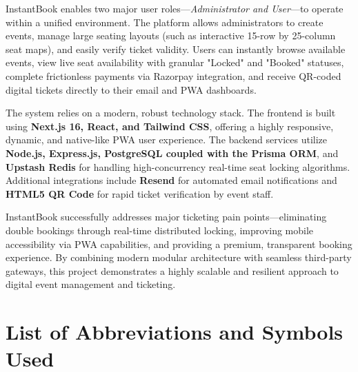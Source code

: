 \documentclass[12pt,a4paper]{report}
\begin{document}
InstantBook enables two major user roles—\textit{Administrator and User}—to operate within a unified environment. The platform allows administrators to create events, manage large seating layouts (such as interactive 15-row by 25-column seat maps), and easily verify ticket validity. Users can instantly browse available events, view live seat availability with granular "Locked" and "Booked" statuses, complete frictionless payments via Razorpay integration, and receive QR-coded digital tickets directly to their email and PWA dashboards. 

The system relies on a modern, robust technology stack. The frontend is built using \textbf{Next.js 16, React, and Tailwind CSS}, offering a highly responsive, dynamic, and native-like PWA user experience. The backend services utilize \textbf{Node.js, Express.js, PostgreSQL coupled with the Prisma ORM}, and \textbf{Upstash Redis} for handling high-concurrency real-time seat locking algorithms. Additional integrations include \textbf{Resend} for automated email notifications and \textbf{HTML5 QR Code} for rapid ticket verification by event staff.

InstantBook successfully addresses major ticketing pain points—eliminating double bookings through real-time distributed locking, improving mobile accessibility via PWA capabilities, and providing a premium, transparent booking experience. By combining modern modular architecture with seamless third-party gateways, this project demonstrates a highly scalable and resilient approach to digital event management and ticketing.

\clearpage

\tableofcontents
\clearpage

\listoffigures
{}
\clearpage

\chapter*{List of Abbreviations and Symbols Used}
\end{document}
